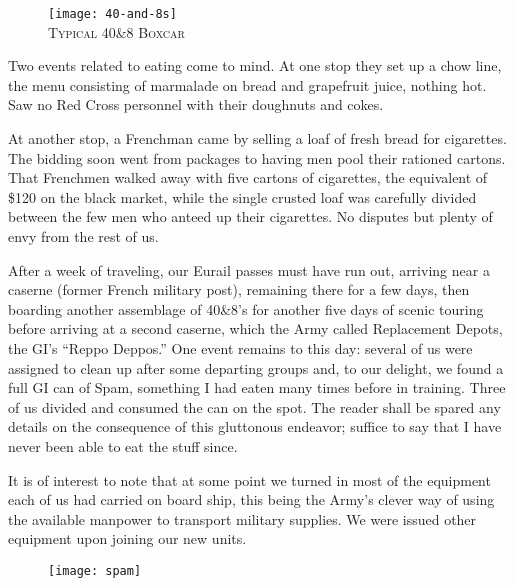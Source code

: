 \documentclass[../m3y]{subfiles}
\begin{document}
\begin{figure}
\centering
\texttt{[image: 40-and-8s]}\\
\medskip
    {\newtimes\textsc{Typical 40\thinspace{}\&\thinspace{}8 Boxcar}}
\end{figure}

Two events related to eating come to mind. At one stop they set up a chow line, the menu consisting of marmalade on bread and grapefruit juice, nothing hot. Saw no Red Cross personnel with their doughnuts and cokes.

At another stop, a Frenchman came by selling a loaf of fresh bread for cigarettes. The bidding soon went from packages to having men pool their rationed cartons. That  Frenchmen walked away with five cartons of cigarettes, the equivalent of \$120 on the black market, while the single crusted loaf was carefully divided between the few men who anteed up their cigarettes. No disputes but plenty of envy from the rest of us.

After a week of traveling, our Eurail passes must have run out, arriving near a caserne (former French military post), remaining there for a few days, then boarding another assemblage of 40\thinspace{}\&\thinspace{}8's for another five days of scenic touring before arriving at a second caserne, which the Army called Replacement Depots, the GI's ``Reppo Deppos.'' One event remains to this day: several of us were assigned to clean up after some departing groups and, to our delight, we found a full GI can of Spam, something I had eaten many times before in training. Three of us divided and consumed the can on the spot. The reader shall be spared any details on the consequence of this gluttonous endeavor; suffice to say that I have never been able to eat the stuff since.

It is of interest to note that at some point we turned in most of the equipment each of us had carried on board ship, this being the Army's clever way of using the available manpower to transport military supplies. We were issued other equipment upon joining our new units.

\bigskip
\begin{figure}[t]
\centering
\texttt{[image: spam]}\\
\end{figure}
\end{document}
